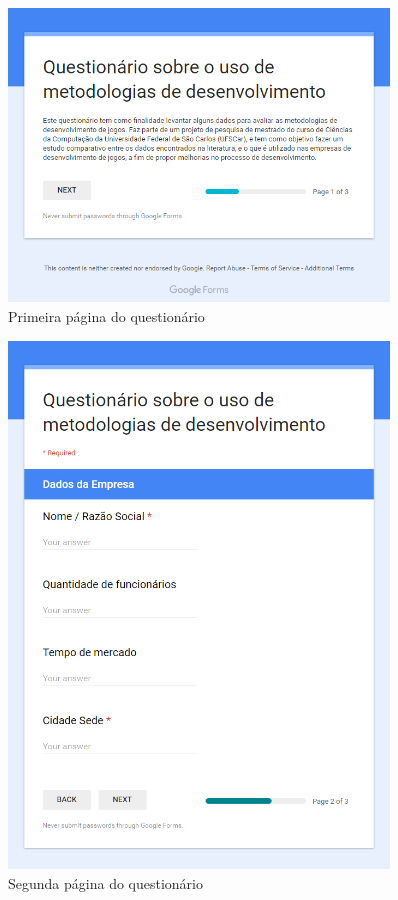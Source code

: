 \documentclass[quali]{ppgccufscar}
\begin{document}
\begin{figure}[!htbp]
	\begin{center}
	\caption{Primeira página do questionário}
	\label{fig_anexoa1}
	\includegraphics[width=0.9\textwidth,natwidth=700,natheight=540]{anexoA1.jpg}
	\end{center}
\end{figure}

\begin{figure}[!htbp]
	\begin{center}
	\caption{Segunda página do questionário}
	\label{fig_anexoa2}
	\includegraphics[width=0.9\textwidth,natwidth=700,natheight=970]{anexoA2.jpg}
	\end{center}
\end{figure}
\end{document}
